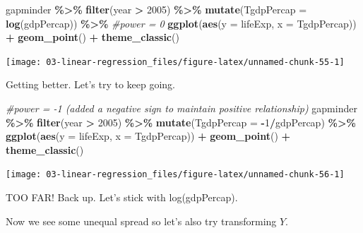 \documentclass[
]{book}
\newenvironment{Shaded}{\begin{snugshade}}{\end{snugshade}}
\newcommand{\AttributeTok}[1]{\textcolor[rgb]{0.13,0.29,0.53}{#1}}
\newcommand{\CommentTok}[1]{\textcolor[rgb]{0.56,0.35,0.01}{\textit{#1}}}
\newcommand{\DecValTok}[1]{\textcolor[rgb]{0.00,0.00,0.81}{#1}}
\newcommand{\FunctionTok}[1]{\textcolor[rgb]{0.13,0.29,0.53}{\textbf{#1}}}
\newcommand{\NormalTok}[1]{#1}
\newcommand{\SpecialCharTok}[1]{\textcolor[rgb]{0.81,0.36,0.00}{\textbf{#1}}}
\begin{document}
\begin{Shaded}
\begin{Highlighting}[]
\NormalTok{gapminder }\SpecialCharTok{\%\textgreater{}\%} 
  \FunctionTok{filter}\NormalTok{(year }\SpecialCharTok{\textgreater{}} \DecValTok{2005}\NormalTok{) }\SpecialCharTok{\%\textgreater{}\%}
  \FunctionTok{mutate}\NormalTok{(}\AttributeTok{TgdpPercap =} \FunctionTok{log}\NormalTok{(gdpPercap)) }\SpecialCharTok{\%\textgreater{}\%} \CommentTok{\#power = 0}
  \FunctionTok{ggplot}\NormalTok{(}\FunctionTok{aes}\NormalTok{(}\AttributeTok{y =}\NormalTok{ lifeExp, }\AttributeTok{x =}\NormalTok{  TgdpPercap)) }\SpecialCharTok{+} 
  \FunctionTok{geom\_point}\NormalTok{() }\SpecialCharTok{+} 
  \FunctionTok{theme\_classic}\NormalTok{()}
\end{Highlighting}
\end{Shaded}

\begin{center}\texttt{[image: 03-linear-regression\_files/figure-latex/unnamed-chunk-55-1]} \end{center}

Getting better. Let's try to keep going.

\begin{Shaded}
\begin{Highlighting}[]
\CommentTok{\#power = {-}1 (added a negative sign to maintain positive relationship)}
\NormalTok{gapminder }\SpecialCharTok{\%\textgreater{}\%} 
  \FunctionTok{filter}\NormalTok{(year }\SpecialCharTok{\textgreater{}} \DecValTok{2005}\NormalTok{) }\SpecialCharTok{\%\textgreater{}\%}
  \FunctionTok{mutate}\NormalTok{(}\AttributeTok{TgdpPercap =} \SpecialCharTok{{-}}\DecValTok{1}\SpecialCharTok{/}\NormalTok{gdpPercap) }\SpecialCharTok{\%\textgreater{}\%} 
  \FunctionTok{ggplot}\NormalTok{(}\FunctionTok{aes}\NormalTok{(}\AttributeTok{y =}\NormalTok{ lifeExp, }\AttributeTok{x =}\NormalTok{  TgdpPercap)) }\SpecialCharTok{+} 
  \FunctionTok{geom\_point}\NormalTok{() }\SpecialCharTok{+} 
  \FunctionTok{theme\_classic}\NormalTok{()}
\end{Highlighting}
\end{Shaded}

\begin{center}\texttt{[image: 03-linear-regression\_files/figure-latex/unnamed-chunk-56-1]} \end{center}

TOO FAR! Back up. Let's stick with log(gdpPercap).

Now we see some unequal spread so let's also try transforming \(Y\).
\end{document}
